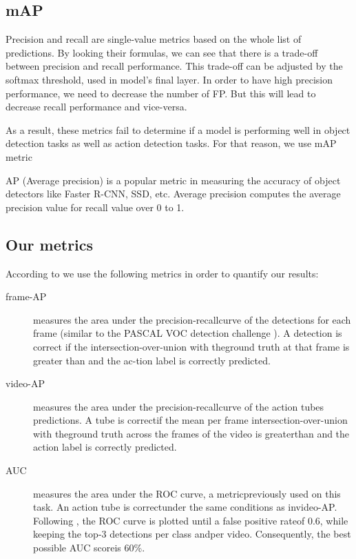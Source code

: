 \documentclass{article}
\begin{document}
\subsection{mAP}
Precision and recall are single-value metrics based on the whole list of predictions. By looking their formulas, we can see that there is
a trade-off between precision and recall performance. This trade-off can be adjusted by the softmax threshold, used in model's final layer.
In order to have high precision performance, we need to decrease the number of FP. But this will lead to decrease recall performance and
vice-versa. \par
As a result, these metrics fail to determine if a model is performing well in object detection tasks as well as action detection tasks. For
that reason, we use mAP metric
\par{AP (Average precision)} is a popular metric in measuring the accuracy of object detectors like Faster R-CNN, SSD, etc. Average precision computes the average precision value for recall value over 0 to 1.

\subsection{Our metrics}
According to \cite{DBLP:journals/corr/GkioxariM14} we use the following metrics in order to quantify our results:
\begin{description}
\item[ frame-AP ] measures the area under the precision-recallcurve of the detections for each frame (similar to the PASCAL  VOC  detection  challenge  \cite{Everingham10}).   A  detection is correct
  if the intersection-over-union with theground truth at that frame is greater than and the ac-tion label is correctly predicted.
\item [ video-AP ] measures the area under the precision-recallcurve of the action tubes predictions. A tube is correctif the mean per frame intersection-over-union with theground truth across the
  frames of the video is greaterthan and the action label is correctly predicted.
\item [ AUC ] measures the area under the ROC curve, a metricpreviously used on this task.  An action tube is correctunder the same conditions as invideo-AP. Following
  \cite{Tian:2013:SDP:2514950.2515975} , the ROC curve is plotted until a false positive rateof 0.6, while keeping the top-3 detections per class andper video. Consequently,
  the best possible AUC scoreis 60\%.
\end{description}


\end{document}
